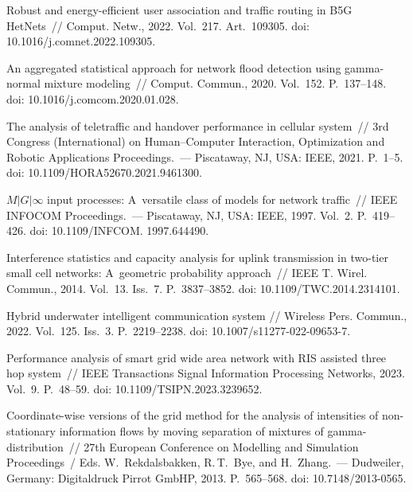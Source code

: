 \begin{multicols}{2}
{{\begin{thebibliography}{99}
\pagebreak

 Robust and energy-efficient user association and traffic routing in B5G HetNets~//
Comput. Netw., 2022. Vol.~217. Art.~109305. 
doi: 10.1016/j.comnet.2022.109305.

 An aggregated statistical approach for network 
flood detection using gamma-normal mixture modeling~// Comput. Commun., 2020. Vol.~152. P.~137--148. 
doi: 10.1016/j.comcom.2020.01.028.

 The analysis of teletraffic 
and handover performance in cellular system~// 3rd  
Congress (International) on Human--Computer Interaction, Optimization and Robotic Applications 
Proceedings.~--- Piscataway, NJ, USA: IEEE, 2021. P.~1--5. 
doi: 10.1109/HORA52670.2021.9461300.

 $M|G|\infty$ input 
processes: A~versatile class of models for network traffic~// IEEE INFOCOM Proceedings.~--- Piscataway, NJ, USA: IEEE, 1997. Vol.~2. P.~419--426.
doi: 10.1109/INFCOM. 1997.644490.

Interference statistics and capacity analysis for uplink transmission in two-tier 
small cell networks: A~geometric probability approach~//
IEEE T. Wirel. Commun., 2014. Vol.~13. Iss.~7. P.~3837--3852. doi: 10.1109/TWC.2014.2314101.

Hybrid underwater intelligent communication system //
Wireless Pers. Commun., 2022. Vol.~125. Iss.~3. P.~2219--2238. doi: 10.1007/s11277-022-09653-7.

Performance analysis of smart grid wide area network with RIS 
assisted three hop system~// IEEE Transactions Signal Information  Processing Networks, 2023. Vol.~9. P.~48--59.
doi: 10.1109/TSIPN.2023.3239652.

Coordinate-wise versions of the grid method for the analysis of intensities of 
non-stationary information flows by moving separation of mixtures of gamma-distribution~// 
27th European Conference on Modelling and Simulation Proceedings~/
  Eds. W.~Rekdalsbakken, R.\,T.~Bye, and H.~Zhang.~--- 
Dudweiler, Germany: Digitaldruck Pirrot GmbHP, 2013. P.~565--568. 
doi: 10.7148/2013-0565.


\end{thebibliography}}}
\end{multicols}
